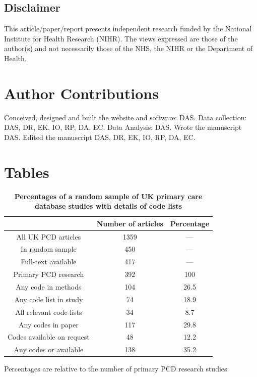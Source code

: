 \documentclass[10pt]{article}
\begin{document}
\subsection*{Disclaimer}
This article/paper/report presents independent research funded by the National Institute for Health Research (NIHR).  The views expressed are those of the author(s) and not necessarily those of the NHS, the NIHR or the Department of Health.

\section*{Author Contributions}

Conceived, designed and built the website and software: DAS. Data collection: DAS, DR, EK, IO, RP, DA, EC.  Data Analysis: DAS. Wrote the manuscript DAS. Edited the manuscript DAS, DR, EK, IO, RP, DA, EC.



\section*{Tables}

\begin{table}[!ht]
  \caption{
    \bf{Percentages of a random sample of UK primary care database studies with details of code lists}}
  \begin{tabular}{|c|c|c|}
    \hline
                 & Number of articles & Percentage \\
    \hline
    All UK PCD articles        & 1359 & ---  \\
    In random sample           & 450  & ---  \\
    Full-text available        & 417  & ---  \\
    Primary PCD research       & 392  & 100  \\
    Any code in methods        & 104  & 26.5 \\
    Any code list in study     & 74   & 18.9 \\
    All relevant code-lists    & 34   & 8.7  \\
    Any codes in paper         & 117  & 29.8 \\
    Codes available on request & 48   & 12.2 \\
    Any codes or available     & 138  & 35.2 \\
    \hline
  \end{tabular}
  \begin{flushleft}Percentages are relative to the number of primary PCD research studies 
  \end{flushleft}
  \label{tab:table1_percentages}
\end{table}
\end{document}
